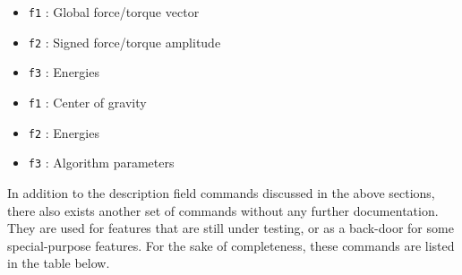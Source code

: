 

\begin{itemize}
\item{\tt f1} : Global force/torque vector
\item{\tt f2} : Signed force/torque amplitude
\item{\tt f3} : Energies
\end{itemize}




\begin{itemize}
\item{\tt f1} : Center of gravity
\item{\tt f2} : Energies
\item{\tt f3} : Algorithm parameters
\end{itemize}




In addition to the description field commands discussed in the above sections,
there also exists another set of commands without any further documentation.
They are used for features that are still under testing, or as a back-door for
some special-purpose features. For the sake of completeness,
these commands are listed in the table below.


